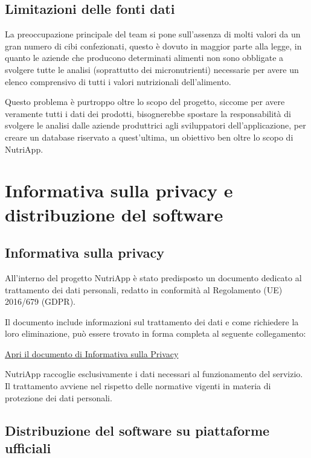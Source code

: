 \documentclass[a4paper,12pt]{article}
\begin{document}
    \subsection{Limitazioni delle fonti dati}

    La preoccupazione principale del team si pone sull'assenza di molti valori da un gran numero di cibi confezionati, questo è dovuto in maggior parte alla legge, in quanto le aziende che producono determinati alimenti non sono obbligate a svolgere tutte le analisi (soprattutto dei micronutrienti) necessarie per avere un elenco comprensivo di tutti i valori nutrizionali dell'alimento.

    Questo problema è purtroppo oltre lo scopo del progetto, siccome per avere veramente tutti i dati dei prodotti, bisognerebbe spostare la responsabilità di svolgere le analisi dalle aziende produttrici agli sviluppatori dell'applicazione, per creare un database riservato a quest'ultima, un obiettivo ben oltre lo scopo di NutriApp.

    \section{Informativa sulla privacy e distribuzione del software}

    \subsection{Informativa sulla privacy}

    All'interno del progetto NutriApp è stato predisposto un documento dedicato al trattamento dei dati personali, redatto in conformità al Regolamento (UE) 2016/679 (GDPR).

    Il documento include informazioni sul trattamento dei dati e come richiedere la loro eliminazione, può essere trovato in forma completa al seguente collegamento:

    \href{https://gitlab.com/ismailbarakat68/nutriapp/-/raw/develop/Documentazione/informativa%20sulla%20privacy.pdf?ref_type=heads&inline=true}{Apri il documento di Informativa sulla Privacy}

    NutriApp raccoglie esclusivamente i dati necessari al funzionamento del servizio. Il trattamento avviene nel rispetto delle normative vigenti in materia di protezione dei dati personali.

    \subsection{Distribuzione del software su piattaforme ufficiali}
\end{document}

